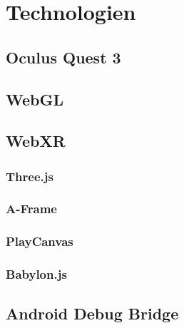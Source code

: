 \chapter{Technologien}

\section{Oculus Quest 3}

\section{WebGL}

\section{WebXR}

\subsection{Three.js}

\subsection{A-Frame}

\subsection{PlayCanvas}

\subsection{Babylon.js}

\section{Android Debug Bridge}